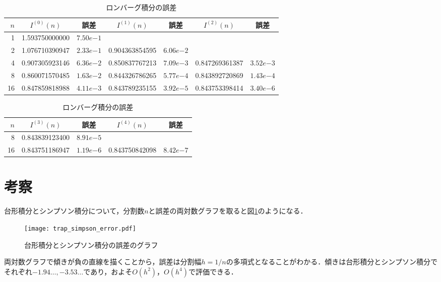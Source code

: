 \documentclass[a4paper]{bxjsarticle}
\begin{document}
	\begin{table}
		\caption{ロンバーグ積分の誤差}
		\label{tab:romberg}
		\begin{center}
			\begin{tabular}{r|cc|cc|cc} \hline
				$n$ & $I^{(0)}(n)$ & 誤差 & $I^{(1)}(n)$ & 誤差 & $I^{(2)}(n)$ & 誤差 \\ \hline
				 1 & 1.593750000000 & $7.50e{-1}$ &&&& \\
				 2 & 1.076710390947 & $2.33e{-1}$ & 0.904363854595 & $6.06e{-2}$ && \\
				 4 & 0.907305923146 & $6.36e{-2}$ & 0.850837767213 & $7.09e{-3}$ & 0.847269361387 & $3.52e{-3}$ \\
				 8 & 0.860071570485 & $1.63e{-2}$ & 0.844326786265 & $5.77e{-4}$ & 0.843892720869 & $1.43e{-4}$ \\
				16 & 0.847859818988 & $4.11e{-3}$ & 0.843789235155 & $3.92e{-5}$ & 0.843753398414 & $3.40e{-6}$ \\ \hline
			\end{tabular}
			\begin{tabular}{r|cc|cc} \hline
				$n$ & $I^{(3)}(n)$ & 誤差 & $I^{(4)}(n)$ & 誤差 \\ \hline
				 8 & 0.843839123400 & $8.91e{-5}$ && \\
				16 & 0.843751186947 & $1.19e{-6}$ & 0.843750842098 & $8.42e{-7}$ \\ \hline
			\end{tabular}
		\end{center}
	\end{table}


	\section{考察}
	台形積分とシンプソン積分について，分割数$n$と誤差の両対数グラフを取ると図\ref{fig:trap_simpson_error}のようになる．

	\begin{figure}[bt]
		\begin{center}
			\texttt{[image: trap\_simpson\_error.pdf]}
		\end{center}
		\caption{台形積分とシンプソン積分の誤差のグラフ}
		\label{fig:trap_simpson_error}
	\end{figure}

	両対数グラフで傾きが負の直線を描くことから，誤差は分割幅$h=1/n$の多項式となることがわかる．傾きは台形積分とシンプソン積分でそれぞれ$-1.94\dots, -3.53\dots$であり，およそ$O(h^2)$，$O(h^4)$で評価できる．
\end{document}
